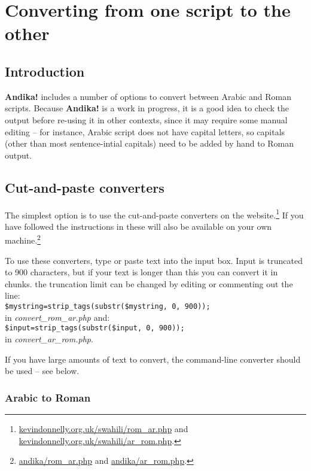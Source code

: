 \chapter{Converting from one script to the other}
\label{ch:conversion}

\section{Introduction}

\textbf{Andika!} includes a number of options to convert between Arabic and Roman scripts.  Because \textbf{Andika!} is a work in progress, it is a good idea to check the output before re-using it in other contexts, since it may require some manual editing -- for instance, Arabic script does not have capital letters, so capitals (other than most sentence-intial capitals) need to be added by hand to Roman output.

\section{Cut-and-paste converters}

The simplest option is to use the cut-and-paste converters on the website.\footnote{\url{kevindonnelly.org.uk/swahili/rom_ar.php} and \url{kevindonnelly.org.uk/swahili/ar_rom.php}.}  If you have followed the instructions in  these will also be available on your own machine.\footnote{\url{andika/rom_ar.php} and \url{andika/ar_rom.php}.}

To use these converters, type or paste text into the input box.  Input is truncated to 900 characters, but if your text is longer than this you can convert it in chunks.  the truncation limit can be changed by editing or commenting out the line: \\
\verb|$mystring=strip_tags(substr($mystring, 0, 900));| \\
in \textit{convert_rom_ar.php} and: \\
\verb|$input=strip_tags(substr($input, 0, 900));| \\
in \textit{convert_ar_rom.php}.

If you have large amounts of text to convert, the command-line converter should be used -- see  below.

\subsection{Arabic to Roman}

